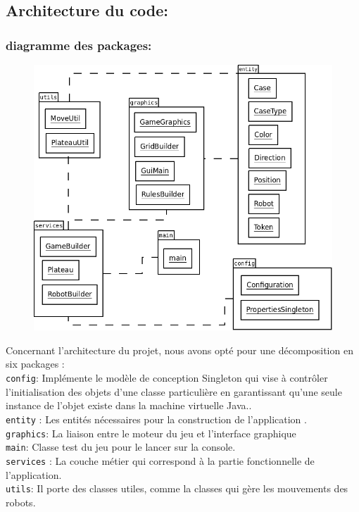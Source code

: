 \documentclass[12pt, a4paper, openany]{article}
\newcommand{\packagename}[1]{\texttt{#1}}
\begin{document}
\subsection{Architecture du code:}
\subsubsection{diagramme des packages:}
\begin{figure}[h]
\begin{center}
\includegraphics[scale=0.3]{DiagrammeDesPackages.png}
\end{center}
\end{figure}

Concernant l'architecture du projet, nous avons opté pour une décomposition en six packages : \\
\packagename{config}: Implémente le modèle de conception Singleton qui vise à contrôler l'initialisation des objets d'une classe particulière en garantissant qu'une seule instance de l'objet existe dans la machine virtuelle Java..\\
\packagename{entity} : Les entités nécessaires pour la construction de l'application .\\
\packagename{graphics}: La liaison entre le moteur du jeu et l'interface graphique\\
\packagename{main}: Classe test du jeu pour le lancer sur la console.\\
\packagename{services} : La couche métier qui correspond à la partie fonctionnelle de l'application.\\
\packagename{utils}: Il porte des classes utiles, comme la classes qui gère les mouvements des robots.\\
\end{document}
